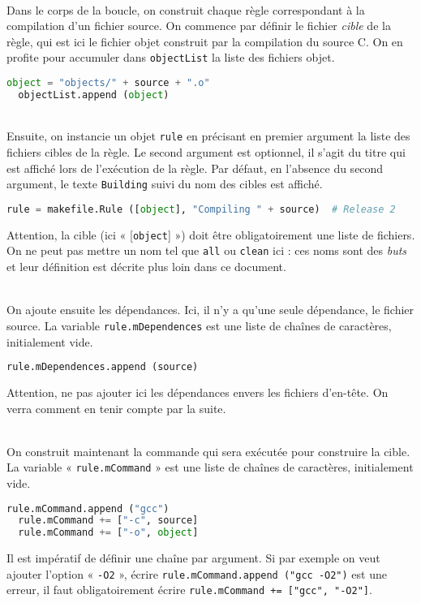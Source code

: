 \documentclass[a4paper,11pt]{extarticle}
\begin{document}
~\\Dans le corps de la boucle, on construit chaque règle correspondant à la compilation d'un fichier source. On commence par définir le fichier \emph{cible} de la règle, qui est ici le fichier objet construit par la compilation du source C. On en profite pour accumuler dans \texttt{objectList} la liste des fichiers objet.
\begin{lstlisting}[language=py]
  object = "objects/" + source + ".o"
  objectList.append (object)
\end{lstlisting}

~\\Ensuite, on instancie un objet \texttt{rule} en précisant en premier argument la liste des fichiers cibles de la règle. Le second argument est optionnel, il s'agit du titre qui est affiché lors de l'exécution de la règle. Par défaut, en l'absence du second argument, le texte \texttt{Building} suivi du nom des cibles est affiché. 
\begin{lstlisting}[language=py]
  rule = makefile.Rule ([object], "Compiling " + source)  # Release 2
\end{lstlisting}
Attention, la cible (ici « [\texttt{object}] ») doit être obligatoirement une liste de fichiers. On ne peut pas mettre un nom tel que \texttt{all} ou \texttt{clean} ici : ces noms sont des \emph{buts} et leur définition est décrite plus loin dans ce document.

~\\On ajoute ensuite les dépendances. Ici, il n'y a qu'une seule dépendance, le fichier source. La variable \texttt{rule.mDependences} est une liste de chaînes de caractères, initialement vide.
\begin{lstlisting}[language=py]
  rule.mDependences.append (source)
\end{lstlisting}
Attention, ne pas ajouter ici les dépendances envers les fichiers d'en-tête. On verra comment en tenir compte par la suite.

~\\On construit maintenant la commande qui sera exécutée pour construire la cible. La variable « \texttt{rule.mCommand} » est une liste de chaînes de caractères, initialement vide.
\begin{lstlisting}[language=py]
  rule.mCommand.append ("gcc")
  rule.mCommand += ["-c", source]
  rule.mCommand += ["-o", object]
\end{lstlisting}
Il est impératif de définir une chaîne par argument. Si par exemple on veut ajouter l'option « \texttt{-O2} », écrire \texttt{rule.mCommand.append ("gcc -O2")} est une erreur, il faut obligatoirement écrire \texttt{rule.mCommand += ["gcc", "-O2"]}.
\end{document}

